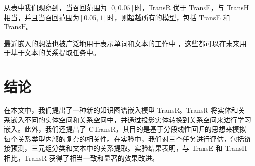     从表中我们观察到，当召回范围为$[0,0.05]$时，TransR 优于 TransE，与 TransH 相当，并且当召回范围为$[0.05,1]$时，则超越所有的模型，包括 TransE 和 TransH。

    最近嵌入的想法也被广泛地用于表示单词和文本的工作中 \cite{bengio2003neural,mikolov2013efficient,mikolov2013distributed,mikolov2013linguistic}，这些都可以在未来用于基于文本的关系提取任务中。

    \section{结论}
    在本文中，我们提出了一种新的知识图谱嵌入模型 TransR。TransR 将实体和关系嵌入不同的实体空间和关系空间中，并通过投影实体转换到关系空间来进行学习嵌入。此外，我们还提出了 CTransR，其目的是基于分段线性回归的思想来模拟每个关系类型内部的复杂的相关性。在实验中，我们对三个任务进行评估，包括链接预测，三元组分类和文本中的关系提取。实验结果表明，与 TransE 和 TransH 相比，TransR 获得了相当一致和显著的效果改进。


